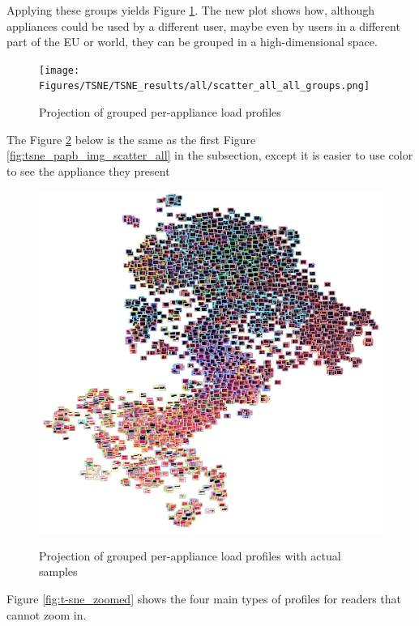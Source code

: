 Applying these groups yields Figure \ref{fig:tsne_papb_scatter_all_groups}.
The new plot shows how, although appliances could be used by a different
user, maybe even by users in a different part of the EU or world,
they can be grouped in a high-dimensional space. 

\begin{figure}[H]
	\centering
	\caption{Projection of grouped per-appliance load profiles}
	\texttt{[image: Figures/TSNE/TSNE\_results/all/scatter\_all\_all\_groups.png]}
	\label{fig:tsne_papb_scatter_all_groups}
\end{figure}

The Figure \ref{fig:tsne_papb_img_scatter_all_groups} below is the same as the first Figure \ref{fig:tsne_papb_img_scatter_all} in the subsection,
except it is easier to use color to see the appliance they present

\begin{figure}[H]
	\centering
	\caption{Projection of grouped per-appliance load profiles with actual samples}
	\includegraphics[width=.9\textwidth]{Figures/TSNE/TSNE_results/all/img_scatter_all_all_groups.png}
	\label{fig:tsne_papb_img_scatter_all_groups}
\end{figure}

Figure \ref{fig:t-sne_zoomed} shows the four main types of profiles for readers that cannot zoom in.

